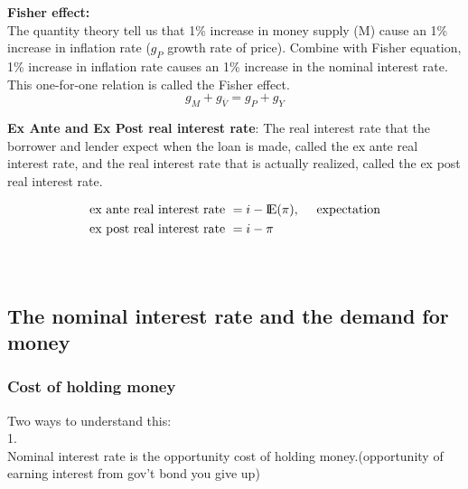 \documentclass[12pt]{article}
\begin{document}
{\textbf {Fisher effect:}}\\
The quantity theory tell us that 1\% increase in money supply (M) cause an 1\%
increase in inflation rate ($ g_{P} $ growth rate of price). Combine with Fisher
equation, 1\% increase in inflation rate causes an 1\% increase in the nominal
interest rate. This one-for-one relation is called the Fisher effect.
\begin{equation*}
g_{M} + g_{ \overline{V}} = g_{P} + g_{Y}
\end{equation*}


{\textbf {Ex Ante and Ex Post real interest rate}}:
The real interest rate that the borrower and lender expect when the loan is made,
called the ex ante real interest rate, and the real interest rate that is actually 
realized, called the ex post real interest rate.

\begin{align*}
\text{ ex ante real interest rate } &= i - {\rm I\!{E}}(\pi), \quad 
\text{ expectation }\\
\text{ ex post real interest rate } &= i - \pi
\end{align*}
\begin{equation*}
\end{equation*}



\noindent{}\\


\subsection{The nominal interest rate and the demand for money}

\subsubsection{Cost of holding money}
Two ways to understand this:\\
1.\\
Nominal interest rate is the opportunity cost of holding money.(opportunity of earning
interest from gov't bond you give up)
\end{document}

